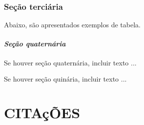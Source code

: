 \documentclass[
  oneside, %
  english,
  brazil
]{abntbibufjf}
\begin{document}
\subsection{\textbf{Seção terciária}} %

Abaixo, são apresentados exemplos de tabela.





\subsubsection{\textit{Seção quaternária}} %

Se houver seção quaternária, incluir texto ...


Se houver seção quinária, incluir texto ...


\chapter{CITAç\~{O}ES} %
\end{document}
